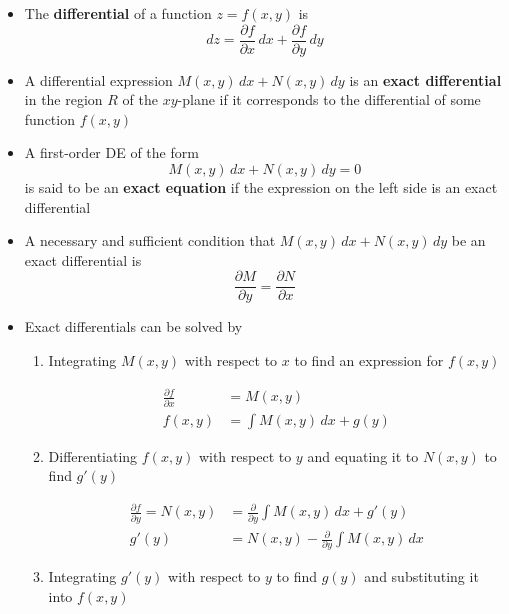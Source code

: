 \documentclass{article}
\begin{document}
\begin{itemize}
  \item The \textbf{differential} of a function $z = f(x, y)$ is \[dz = \frac{\partial f}{\partial x} \,d x + \frac{\partial f}{\partial y} \, dy\]

  \item A differential expression $M(x, y) \,d x + N(x, y) \,d y$ is an \textbf{exact differential} in the region $R$ of the $xy$-plane if it corresponds to the differential of some function $f(x, y)$

  \item A first-order DE of the form \[M(x, y) \,d x + N(x, y) \,d y = 0\] is said to be an \textbf{exact equation} if the expression on the left side is an exact differential

  \item A necessary and sufficient condition that $M(x, y) \,d x + N(x, y) \,d y$ be an exact differential is \[\frac{\partial M}{\partial y} = \frac{\partial N}{\partial x}\]

  \item Exact differentials can be solved by

        \begin{enumerate}
          \item Integrating $M(x, y)$ with respect to $x$ to find an expression for $f(x, y)$

                \begin{align*}
                  \frac{\partial f}{\partial x} & = M(x, y)                   \\
                  f(x, y)                       & = \int M(x, y) \,d x + g(y)
                \end{align*}

          \item Differentiating $f(x, y)$ with respect to $y$ and equating it to $N(x, y)$ to find $g'(y)$

                \begin{align*}
                  \frac{\partial f}{\partial y} = N(x, y) & = \frac{\partial}{\partial y} \int M(x, y) \,d x + g'(y)   \\
                  g'(y)                                   & = N(x, y) - \frac{\partial}{\partial y} \int M(x, y) \,d x
                \end{align*}

          \item Integrating $g'(y)$ with respect to $y$ to find $g(y)$ and substituting it into $f(x, y)$


\end{enumerate}
\end{itemize}
\end{document}

